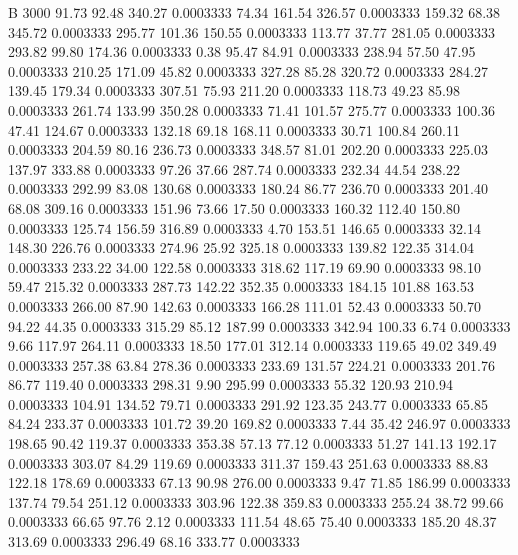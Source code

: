 


B 3000
  91.73   92.48  340.27   0.0003333
  74.34  161.54  326.57   0.0003333
 159.32   68.38  345.72   0.0003333
 295.77  101.36  150.55   0.0003333
 113.77   37.77  281.05   0.0003333
 293.82   99.80  174.36   0.0003333
   0.38   95.47   84.91   0.0003333
 238.94   57.50   47.95   0.0003333
 210.25  171.09   45.82   0.0003333
 327.28   85.28  320.72   0.0003333
 284.27  139.45  179.34   0.0003333
 307.51   75.93  211.20   0.0003333
 118.73   49.23   85.98   0.0003333
 261.74  133.99  350.28   0.0003333
  71.41  101.57  275.77   0.0003333
 100.36   47.41  124.67   0.0003333
 132.18   69.18  168.11   0.0003333
  30.71  100.84  260.11   0.0003333
 204.59   80.16  236.73   0.0003333
 348.57   81.01  202.20   0.0003333
 225.03  137.97  333.88   0.0003333
  97.26   37.66  287.74   0.0003333
 232.34   44.54  238.22   0.0003333
 292.99   83.08  130.68   0.0003333
 180.24   86.77  236.70   0.0003333
 201.40   68.08  309.16   0.0003333
 151.96   73.66   17.50   0.0003333
 160.32  112.40  150.80   0.0003333
 125.74  156.59  316.89   0.0003333
   4.70  153.51  146.65   0.0003333
  32.14  148.30  226.76   0.0003333
 274.96   25.92  325.18   0.0003333
 139.82  122.35  314.04   0.0003333
 233.22   34.00  122.58   0.0003333
 318.62  117.19   69.90   0.0003333
  98.10   59.47  215.32   0.0003333
 287.73  142.22  352.35   0.0003333
 184.15  101.88  163.53   0.0003333
 266.00   87.90  142.63   0.0003333
 166.28  111.01   52.43   0.0003333
  50.70   94.22   44.35   0.0003333
 315.29   85.12  187.99   0.0003333
 342.94  100.33    6.74   0.0003333
   9.66  117.97  264.11   0.0003333
  18.50  177.01  312.14   0.0003333
 119.65   49.02  349.49   0.0003333
 257.38   63.84  278.36   0.0003333
 233.69  131.57  224.21   0.0003333
 201.76   86.77  119.40   0.0003333
 298.31    9.90  295.99   0.0003333
  55.32  120.93  210.94   0.0003333
 104.91  134.52   79.71   0.0003333
 291.92  123.35  243.77   0.0003333
  65.85   84.24  233.37   0.0003333
 101.72   39.20  169.82   0.0003333
   7.44   35.42  246.97   0.0003333
 198.65   90.42  119.37   0.0003333
 353.38   57.13   77.12   0.0003333
  51.27  141.13  192.17   0.0003333
 303.07   84.29  119.69   0.0003333
 311.37  159.43  251.63   0.0003333
  88.83  122.18  178.69   0.0003333
  67.13   90.98  276.00   0.0003333
   9.47   71.85  186.99   0.0003333
 137.74   79.54  251.12   0.0003333
 303.96  122.38  359.83   0.0003333
 255.24   38.72   99.66   0.0003333
  66.65   97.76    2.12   0.0003333
 111.54   48.65   75.40   0.0003333
 185.20   48.37  313.69   0.0003333
 296.49   68.16  333.77   0.0003333
